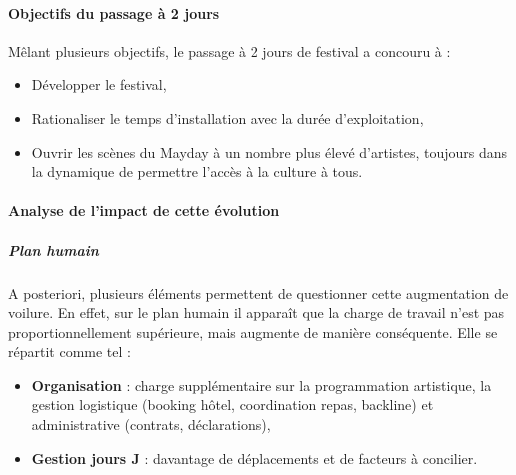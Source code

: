 \documentclass[12pt,a4paper]{report}
\begin{document}
\paragraph{Objectifs du passage à 2 jours}
Mêlant plusieurs objectifs, le passage à 2 jours de festival a concouru à : 
\begin{itemize}
\item Développer le festival,
\item Rationaliser le temps d'installation avec la durée d'exploitation,
\item Ouvrir les scènes du Mayday à un nombre plus élevé d'artistes, toujours dans la dynamique de permettre l’accès à la culture à tous.
\end{itemize}

\paragraph{Analyse de l'impact de cette évolution}
\subparagraph{Plan humain}
A posteriori, plusieurs éléments permettent de questionner cette augmentation de voilure. En effet, sur le plan humain il apparaît que la charge de travail n'est pas proportionnellement supérieure, mais augmente de manière conséquente. Elle se répartit comme tel : 
\begin{itemize}
\item \textbf{Organisation} : charge supplémentaire sur la programmation artistique, la gestion logistique (booking hôtel, coordination repas, backline) et administrative (contrats, déclarations),
\item \textbf{Gestion jours J} : davantage de déplacements et de facteurs à concilier.
\end{itemize}
\end{document}
